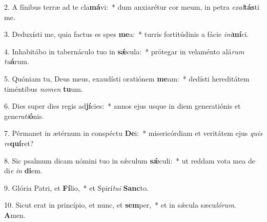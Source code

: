 2. A fínibus terræ ad te cla\textbf{má}vi:~*  dum anxiarétur cor meum, in petra \textit{ex}\textit{al}\textbf{tás}ti me.\

3. Deduxísti me, quia factus es spes \textbf{me}a:~*  turris fortitúdinis a fácie \textit{in}\textit{i}\textbf{mí}ci.\

4. Inhabitábo in tabernáculo tuo in \textbf{sǽ}cula:~*  prótegar in velaménto alá\textit{rum} \textit{tu}\textbf{á}rum.\

5. Quóniam tu, Deus meus, exaudísti oratiónem \textbf{me}am:~*  dedísti hereditátem timéntibus \textit{no}\textit{men} \textbf{tu}um.\

6. Dies super dies regis ad\textbf{jí}cies:~*  annos ejus usque in diem generatiónis et gene\textit{ra}\textit{ti}\textbf{ó}nis.\

7. Pérmanet in ætérnum in conspéctu \textbf{De}i:~*  misericórdiam et veritátem ejus \textit{quis} \textit{re}\textbf{quí}ret?\

8. Sic psalmum dicam nómini tuo in sǽculum \textbf{sǽ}culi:~*  ut reddam vota mea de di\textit{e} \textit{in} \textbf{di}em.\

9. Glória Patri, et \textbf{Fí}lio,~*  et Spirí\textit{tu}\textit{i} \textbf{Sanc}to.\

10. Sicut erat in princípio, et nunc, et \textbf{sem}per,~*  et in sǽcula sæcu\textit{ló}\textit{rum}. \textbf{A}men.\

